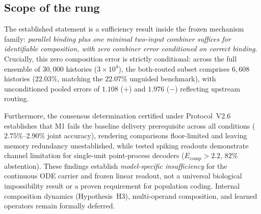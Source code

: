 \subsection{Scope of the rung}
\label{sec:scope8}

The established statement is a sufficiency result inside the frozen mechanism family: \emph{parallel binding plus one minimal two-input combiner suffices for identifiable composition, with zero combiner error conditioned on correct binding}. Crucially, this zero composition error is strictly conditional: across the full ensemble of $30{,}000$ histories ($3\times10^4$), the both-routed subset comprises $6{,}608$ histories ($22.03\%$, matching the $22.07\%$ unguided benchmark), with unconditioned pooled errors of $1.108$ ($+$) and $1.976$ ($-$) reflecting upstream routing.

Furthermore, the consensus determination certified under Protocol~V2.6 establishes that M1 fails the baseline delivery prerequisite across all conditions ($2.75\%$--$2.90\%$ joint accuracy), rendering comparisons floor-limited and leaving memory redundancy unestablished, while tested spiking readouts demonstrate channel limitation for single-unit point-process decoders ($E_{\text{comp}} > 2.2$, $82\%$ abstention). These findings establish \emph{model-specific insufficiency} for the continuous ODE carrier and frozen linear readout, not a universal biological impossibility result or a proven requirement for population coding. Internal composition dynamics (Hypothesis~H3), multi-operand composition, and learned operators remain formally deferred.
